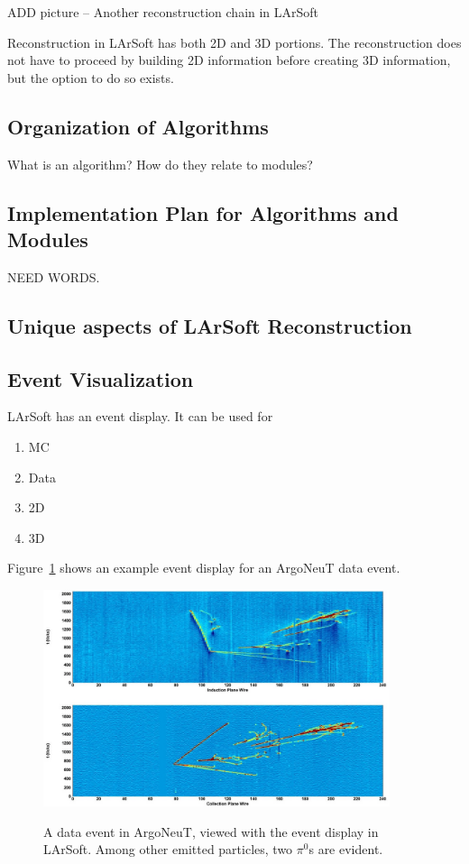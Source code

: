 \documentclass[12pt]{elsarticle}
\begin{document}
ADD picture -- Another reconstruction chain in LArSoft

Reconstruction in LArSoft has both 2D and 3D portions. The reconstruction does not have to proceed by building 2D information before creating 3D information, but the option to do so exists. 

\subsection{Organization of Algorithms}

What is an algorithm? How do they relate to modules?

\subsection{Implementation Plan for Algorithms and Modules}
NEED WORDS.

\subsection{Unique aspects of LArSoft Reconstruction}

\subsection{Event Visualization}
LArSoft has an event display.
It can be used for
\begin{enumerate}
\item{MC}
\item{Data}
\item{2D}
\item{3D}
\end{enumerate}  

Figure~\ref{argo.evd} shows an example event display for an ArgoNeuT data event.

\hspace*{2cm}
\begin{figure}[h]
\centering
\caption{A data event in ArgoNeuT, viewed with the event display in LArSoft. Among other emitted particles, two $\pi^0$s are evident.}
\includegraphics[width=4.0in]{./mtrls/imgs/ArgoNeuT_event.jpg}
\label{argo.evd}
\end{figure}
\end{document}
